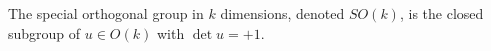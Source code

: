 The special orthogonal group in $k$ dimensions, denoted $SO(k)$, is the closed subgroup of $u \in O(k)$ with $\det u = +1$.
